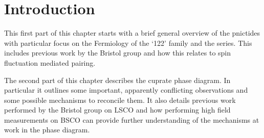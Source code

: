 
\chapter{Introduction}




\begin{chapterabstract}
This first part of this chapter starts with a brief general overview of the pnictides with particular focus on the Fermiology of the `122' family and the \BaFePAs series. This includes previous work by the Bristol group and how this relates to spin fluctuation mediated pairing.

The second part of this chapter describes the cuprate phase diagram. In particular it outlines some important, apparently conflicting observations and some possible mechanisms to reconcile them. It also details previous work performed by the Bristol group on \acs{LSCO} and how performing high field measurements on \acs{BSCO} can provide further understanding of the mechanisms at work in the phase diagram.
\end{chapterabstract}










